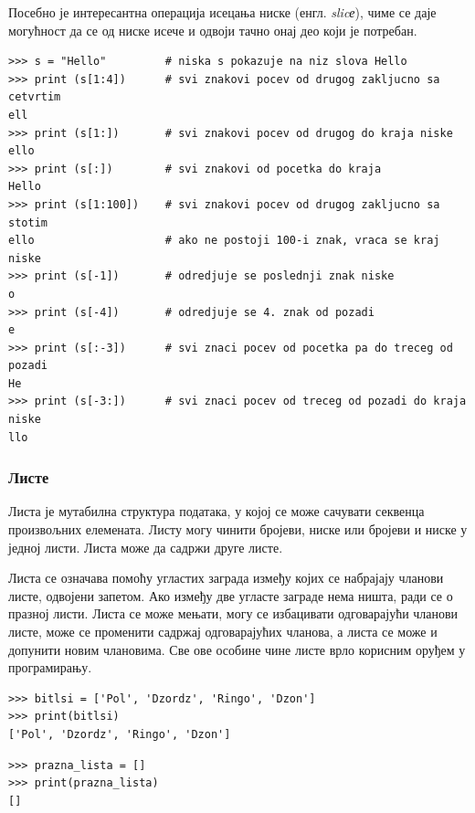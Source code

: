 Посебно је интересантна операција исецања ниске (енгл. \emph{slicе}), чиме се даје могућност да се од ниске исече и одвоји тачно онај део који је потребан.

\begin{lstlisting}[caption = Комадање ниске, label = slice]
>>> s = "Hello"         # niska s pokazuje na niz slova Hello
>>> print (s[1:4])      # svi znakovi pocev od drugog zakljucno sa cetvrtim
ell
>>> print (s[1:])       # svi znakovi pocev od drugog do kraja niske
ello
>>> print (s[:])        # svi znakovi od pocetka do kraja
Hello
>>> print (s[1:100])    # svi znakovi pocev od drugog zakljucno sa stotim
ello                    # ako ne postoji 100-i znak, vraca se kraj niske
>>> print (s[-1])       # odredjuje se poslednji znak niske
o
>>> print (s[-4])       # odredjuje se 4. znak od pozadi
e
>>> print (s[:-3])      # svi znaci pocev od pocetka pa do treceg od pozadi
He
>>> print (s[-3:])      # svi znaci pocev od treceg od pozadi do kraja niske
llo

\end{lstlisting}

\subsubsection{Листе}

Листа је мутабилна структура података, у којој се може сачувати секвенца произвољних елемената. Листу могу чинити бројеви, ниске или бројеви и ниске у једној листи. Листа може да садржи друге листе.

Листа се означава помоћу угластих заграда између којих се набрајају чланови листе, одвојени запетом. Ако између две угласте заграде нема ништа, ради се о празној листи. Листа се може мењати, могу се избацивати одговарајући чланови листе, може се променити садржај одговарајућих чланова, а листа се може и допунити новим члановима. Све ове особине чине листе врло корисним оруђем у програмирању.

\begin{lstlisting}[caption = Креирање листе, label = lista]
>>> bitlsi = ['Pol', 'Dzordz', 'Ringo', 'Dzon']
>>> print(bitlsi)
['Pol', 'Dzordz', 'Ringo', 'Dzon']
\end{lstlisting}

\begin{lstlisting}[caption = Креирање празне листе, label = prazna_lista]
>>> prazna_lista = []
>>> print(prazna_lista)
[]
\end{lstlisting}

